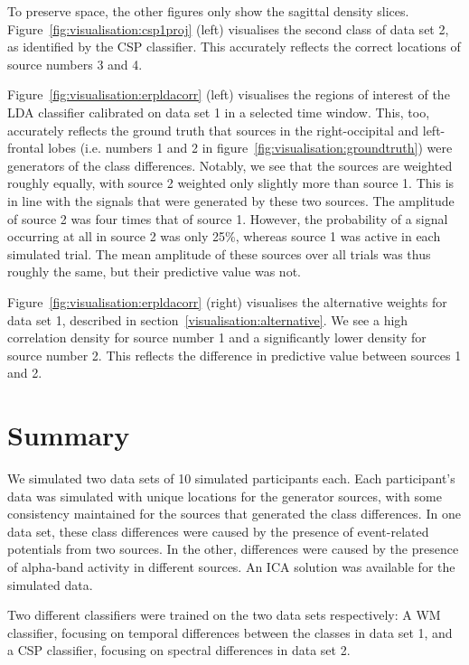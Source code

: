 To preserve space, the other figures only show the sagittal density slices. Figure~\ref{fig:visualisation:csp1proj} (left) visualises the second class of data set 2, as identified by the CSP classifier. This accurately reflects the correct locations of source numbers 3 and 4.

Figure~\ref{fig:visualisation:erpldacorr} (left) visualises the regions of interest of the LDA classifier calibrated on data set 1 in a selected time window. This, too, accurately reflects the ground truth that sources in the right-occipital and left-frontal lobes (i.e. numbers 1 and 2 in figure~\ref{fig:visualisation:groundtruth}) were generators of the class differences. Notably, we see that the sources are weighted roughly equally, with source 2 weighted only slightly more than source 1. This is in line with the signals that were generated by these two sources. The amplitude of source 2 was four times that of source 1. However, the probability of a signal occurring at all in source 2 was only 25\%, whereas source 1 was active in each simulated trial. The mean amplitude of these sources over all trials was thus roughly the same, but their predictive value was not.

Figure~\ref{fig:visualisation:erpldacorr} (right) visualises the alternative weights for data set 1, described in section~\ref{visualisation:alternative}. We see a high correlation density for source number 1 and a significantly lower density for source number 2. This reflects the difference in predictive value between sources 1 and 2.


\section{Summary}

We simulated two data sets of 10 simulated participants each. Each participant's data was simulated with unique locations for the generator sources, with some consistency maintained for the sources that generated the class differences. In one data set, these class differences were caused by the presence of event-related potentials from two sources. In the other, differences were caused by the presence of alpha-band activity in different sources. An ICA solution was available for the simulated data.

Two different classifiers were trained on the two data sets respectively: A WM classifier, focusing on temporal differences between the classes in data set 1, and a CSP classifier, focusing on spectral differences in data set 2.

